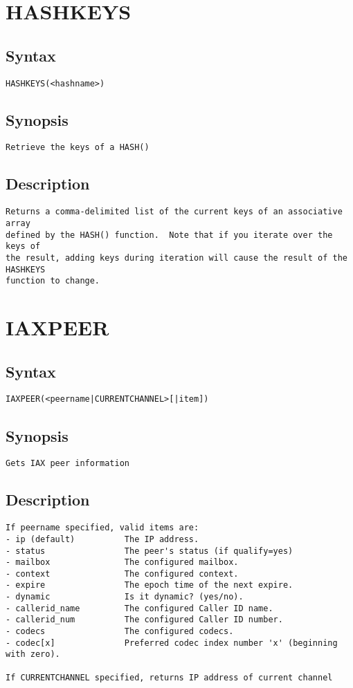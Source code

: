 \section{HASHKEYS}
\subsection{Syntax}
\begin{verbatim}
HASHKEYS(<hashname>)
\end{verbatim}
\subsection{Synopsis}
\begin{verbatim}
Retrieve the keys of a HASH()
\end{verbatim}
\subsection{Description}
\begin{verbatim}
Returns a comma-delimited list of the current keys of an associative array
defined by the HASH() function.  Note that if you iterate over the keys of
the result, adding keys during iteration will cause the result of the HASHKEYS
function to change.

\end{verbatim}


\section{IAXPEER}
\subsection{Syntax}
\begin{verbatim}
IAXPEER(<peername|CURRENTCHANNEL>[|item])
\end{verbatim}
\subsection{Synopsis}
\begin{verbatim}
Gets IAX peer information
\end{verbatim}
\subsection{Description}
\begin{verbatim}
If peername specified, valid items are:
- ip (default)          The IP address.
- status                The peer's status (if qualify=yes)
- mailbox               The configured mailbox.
- context               The configured context.
- expire                The epoch time of the next expire.
- dynamic               Is it dynamic? (yes/no).
- callerid_name         The configured Caller ID name.
- callerid_num          The configured Caller ID number.
- codecs                The configured codecs.
- codec[x]              Preferred codec index number 'x' (beginning with zero).

If CURRENTCHANNEL specified, returns IP address of current channel


\end{verbatim}


